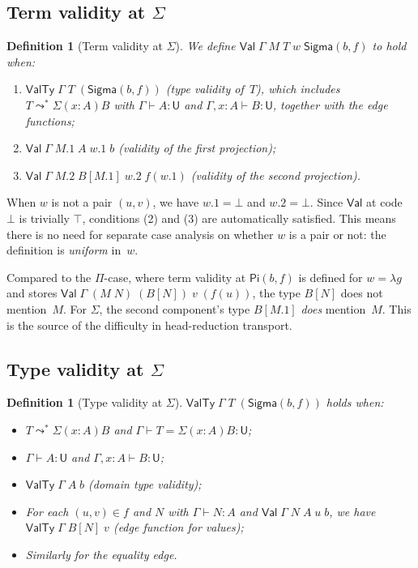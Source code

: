 \documentclass[11pt]{article}
\newcommand{\hastype}[3]{#1 \vdash #2 : #3}
\newcommand{\conveq}[4]{#1 \vdash #2 = #3 : #4}
\newcommand{\App}[2]{#1\;#2}
\newcommand{\substone}[2]{#1[#2]}
\newcommand{\U}{\mathsf{U}}
\newcommand{\PiC}[2]{\mathsf{Pi}(#1,#2)}
\newcommand{\SigmaC}[2]{\mathsf{Sigma}(#1,#2)}
\newcommand{\Red}{\mathrel{\leadsto^*}}
\newcommand{\Sigmatype}[2]{\Sigma(#1)#2}
\newcommand{\Val}{\mathsf{Val}}
\newcommand{\ValTy}{\mathsf{ValTy}}
\newcommand{\Bot}{\bot}
\newcommand{\pj}[2]{#1\mbox{.}#2}
\newtheorem{definition}[theorem]{Definition}
\begin{document}
\subsection{Term validity at $\Sigma$}

\begin{definition}[Term validity at $\Sigma$]
We define $\Val\;\Gamma\;M\;T\;w\;\SigmaC{b}{f}$ to hold when:
\begin{enumerate}
\item $\ValTy\;\Gamma\;T\;(\SigmaC{b}{f})$ (type validity of~$T$), which
  includes $T \Red \Sigmatype{x{:}A}{B}$ with $\hastype{\Gamma}{A}{\U}$ and
  $\hastype{\Gamma, x{:}A}{B}{\U}$, together with the edge functions;
\item $\Val\;\Gamma\;\pj{M}{1}\;A\;\pj{w}{1}\;b$ (validity of the
  first projection);
\item $\Val\;\Gamma\;\pj{M}{2}\;\substone{B}{\pj{M}{1}}\;\pj{w}{2}\;f(\pj{w}{1})$
  (validity of the second projection).
\end{enumerate}
\end{definition}

\begin{remark}
When $w$ is not a pair $(u,v)$, we have $\pj{w}{1} = \Bot$ and
$\pj{w}{2} = \Bot$.  Since $\Val$ at code $\Bot$ is trivially $\top$,
conditions (2) and (3) are automatically satisfied.  This means there is no
need for separate case analysis on whether $w$ is a pair or not: the
definition is \emph{uniform} in~$w$.
\end{remark}

\begin{remark}
Compared to the $\Pi$-case, where term validity at $\PiC{b}{f}$ is
defined for $w = \lambda g$ and stores
$\Val\;\Gamma\;(\App{M}{N})\;(\substone{B}{N})\;v\;(f(u))$, the type
$\substone{B}{N}$ does not mention~$M$.  For $\Sigma$, the second
component's type $\substone{B}{\pj{M}{1}}$ \emph{does} mention~$M$.
This is the source of the difficulty in head-reduction transport.
\end{remark}

\subsection{Type validity at $\Sigma$}

\begin{definition}[Type validity at $\Sigma$]
$\ValTy\;\Gamma\;T\;(\SigmaC{b}{f})$ holds when:
\begin{itemize}
\item $T \Red \Sigmatype{x{:}A}{B}$ and
  $\conveq{\Gamma}{T}{\Sigmatype{x{:}A}{B}}{\U}$;
\item $\hastype{\Gamma}{A}{\U}$ and $\hastype{\Gamma, x{:}A}{B}{\U}$;
\item $\ValTy\;\Gamma\;A\;b$ (domain type validity);
\item For each $(u,v) \in f$ and $N$ with $\hastype{\Gamma}{N}{A}$ and
  $\Val\;\Gamma\;N\;A\;u\;b$, we have $\ValTy\;\Gamma\;\substone{B}{N}\;v$
  (edge function for values);
\item Similarly for the equality edge.
\end{itemize}
\end{definition}
\end{document}
